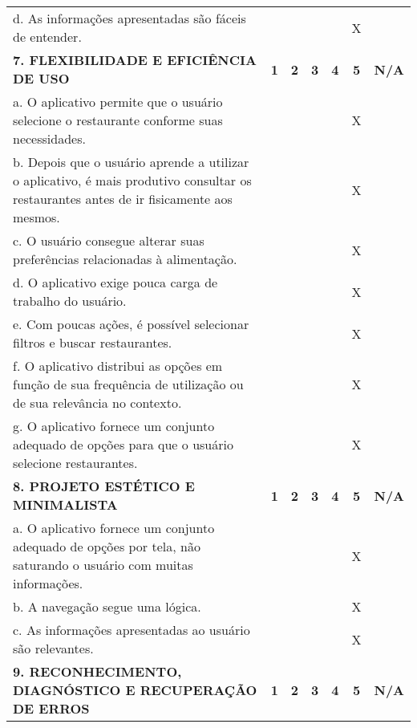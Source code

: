 \documentclass[portuguese,oneside]{tcc}
\begin{document}
\begin{center}
\begin{longtabu}{|L{25em}|c|c|c|c|c|c|}
																												d. As informações apresentadas são fáceis de entender. & & & & & X & \\ 
																												\textbf{7. FLEXIBILIDADE E EFICIÊNCIA DE USO} & \textbf{1} & \textbf{2} & \textbf{3} & \textbf{4} & \textbf{5} & \textbf{N/A} \\ 
																												a. O aplicativo permite que o usuário selecione o restaurante conforme suas necessidades. & & & & & X & \\ 
																												b. Depois que o usuário aprende a utilizar o aplicativo, é mais produtivo consultar os restaurantes antes de ir fisicamente aos mesmos. & & & & & X & \\ 
																												c. O usuário consegue alterar suas preferências relacionadas à alimentação. & & & & & X & \\ 
																												d. O aplicativo exige pouca carga de trabalho do usuário. & & & & & X & \\ 
																												e. Com poucas ações, é possível selecionar filtros e buscar restaurantes. & & & & & X & \\ 
																												f. O aplicativo distribui as opções em função de sua frequência de utilização ou de sua relevância no contexto.	& & & & & X & \\ 
																												g. O aplicativo fornece um conjunto adequado de opções para que o usuário selecione restaurantes. & & & & & X & \\ 
																												\textbf{8. PROJETO ESTÉTICO E MINIMALISTA} & \textbf{1} & \textbf{2} & \textbf{3} & \textbf{4} & \textbf{5} & \textbf{N/A} \\ 
																												a. O aplicativo fornece um conjunto adequado de opções por tela, não saturando o usuário com muitas informações. & & & & & X & \\ 
																												b. A navegação segue uma lógica. & & & & & X & \\ 
																												c. As informações apresentadas ao usuário são relevantes. & & & & & X & \\ 
																												\textbf{9. RECONHECIMENTO, DIAGNÓSTICO E RECUPERAÇÃO DE ERROS} & \textbf{1} & \textbf{2} & \textbf{3} & \textbf{4} & \textbf{5} & \textbf{N/A} \\ 

\end{longtabu}
\end{center}
\end{document}
